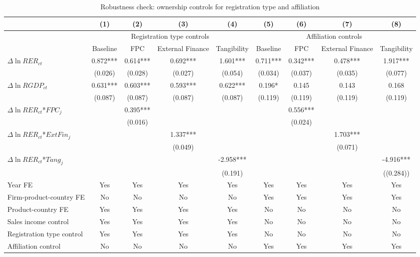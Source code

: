 \documentclass[12pt]{article}
\begin{document}
\begin{table}
	\centering
	\caption{Robustness check: ownership controls for registration type and affiliation}
	\begin{threeparttable}
		\begin{tabular}{lcccccccc}
			\toprule
			& (1)   & (2)   & (3)   & (4) &  (5)  &  (6)  & (7)  & (8)\\
			\midrule
			& \multicolumn{4}{c}{Registration type controls} & \multicolumn{4}{c}{Affiliation controls}\\
			& Baseline & FPC   & External Finance & Tangibility & Baseline & FPC & External Finance & Tangibility\\
			\midrule
			$\Delta \ln RER_{ct}$ & 0.872*** & 0.614*** & 0.692*** & 1.601***& 0.711*** & 0.342*** & 0.478*** & 1.917***\\
			& (0.026) & (0.028) & (0.027) & (0.054) & (0.034) & (0.037) & (0.035) & (0.077)\\
			$\Delta \ln RGDP_{ct}$ & 0.631*** & 0.603*** & 0.593*** & 0.622***& 0.196* & 0.145 & 0.143 & 0.168\\
			& (0.087) & (0.087) & (0.087) & (0.087) & (0.119) & (0.119) & (0.119) & (0.119)\\
			$\Delta \ln RER_{ct}$*$FPC_{j}$ &       & 0.395*** &       &  &  & 0.556*** &&\\
			&       & (0.016) &       &  &  & (0.024) &&\\
			$\Delta \ln RER_{ct}$*$ExtFin_{j}$ &       &       & 1.337*** &  &&&1.703***&\\
			&       &       & (0.049) &  &&&(0.071)&\\
			$\Delta \ln RER_{ct}$*$Tang_{j}$ &       &       &       & -2.958*** &&&&-4.916***\\
			&       &       &       & (0.191) &&&&((0.284))\\
			Year FE  &  Yes   & Yes   & Yes   & Yes & Yes   & Yes   & Yes   & Yes\\
			Firm-product-country FE  & No & No & No & No &  Yes   & Yes   & Yes   & Yes\\
			Product-country FE &  Yes   & Yes   & Yes   & Yes & No & No & No & No\\
			Sales income control &  Yes   & Yes   & Yes   & Yes & No & No & No & No\\
			Registration type control &  Yes   & Yes & Yes  & Yes & No & No & No & No\\
			Affiliation control & No & No & No & No &  Yes  & Yes & Yes  & Yes \\

\end{tabular}
\end{threeparttable}
\end{table}
\end{document}
